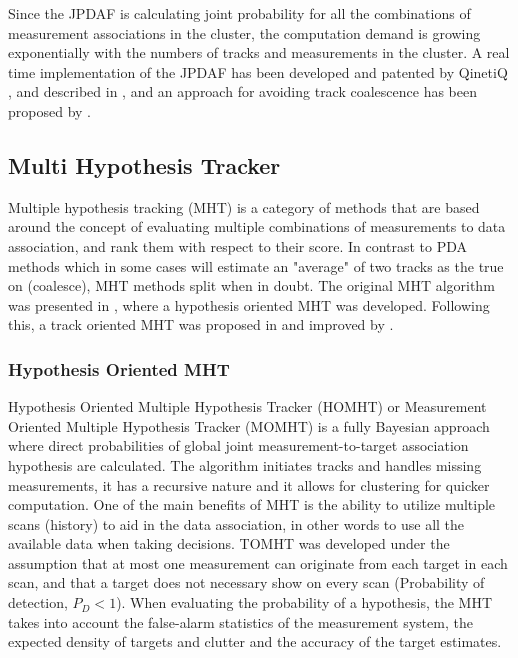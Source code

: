 Since the JPDAF is calculating joint probability for all the combinations of measurement associations in the cluster, the computation demand is growing exponentially with the numbers of tracks and measurements in the cluster. A real time implementation of the JPDAF has been developed and patented by QinetiQ \cite{QinetiQ2003}, and described in \cite{Horridge}, and an approach for avoiding track coalescence has been proposed by \cite{Blom2000}.

\subsection{Multi Hypothesis Tracker}
Multiple hypothesis tracking (MHT) is a category of methods that are based around the concept of evaluating multiple combinations of measurements to data association, and rank them with respect to their score. In contrast to PDA methods which in some cases will estimate an "average" of two tracks as the true on (coalesce), MHT methods split when in doubt. The original MHT algorithm was presented in \cite{Reid1978}, where a hypothesis oriented MHT was developed. Following this, a track oriented MHT was proposed in \cite{Kurien1990} and improved by \cite{Bar-Shalom2007}.

\subsubsection{Hypothesis Oriented MHT}
Hypothesis Oriented Multiple Hypothesis Tracker (HOMHT) or Measurement Oriented Multiple Hypothesis Tracker (MOMHT) is a fully Bayesian approach where direct probabilities of global joint measurement-to-target association hypothesis are calculated. The algorithm initiates tracks and handles missing measurements, it has a recursive nature and it allows for clustering for quicker computation. One of the main benefits of MHT is the ability to utilize multiple scans (history) to aid in the data association, in other words to use all the available data when taking decisions. TOMHT was developed under the assumption that at most one measurement can originate from each target in each scan, and that a target does not necessary show on every scan (Probability of detection, $P_D < 1$). When evaluating the probability of a hypothesis, the MHT takes into account the false-alarm statistics of the measurement system, the expected density of targets and clutter and the accuracy of the target estimates.

